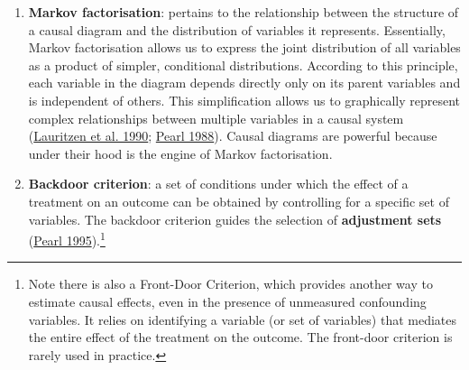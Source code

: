 \documentclass[
  singlecolumn]{article}
\begin{document}
\begin{enumerate}
\def\labelenumi{\arabic{enumi}.}
\setcounter{enumi}{9}
\item
  \textbf{Markov factorisation}: pertains to the relationship between
  the structure of a causal diagram and the distribution of variables it
  represents. Essentially, Markov factorisation allows us to express the
  joint distribution of all variables as a product of simpler,
  conditional distributions. According to this principle, each variable
  in the diagram depends directly only on its parent variables and is
  independent of others. This simplification allows us to graphically
  represent complex relationships between multiple variables in a causal
  system (\protect\hyperlink{ref-lauritzen1990}{Lauritzen et al. 1990};
  \protect\hyperlink{ref-pearl1988}{Pearl 1988}). Causal diagrams are
  powerful because under their hood is the engine of Markov
  factorisation.
\item
  \textbf{Backdoor criterion}: a set of conditions under which the
  effect of a treatment on an outcome can be obtained by controlling for
  a specific set of variables. The backdoor criterion guides the
  selection of \textbf{adjustment sets}
  (\protect\hyperlink{ref-pearl1995}{Pearl 1995}).\footnote{Note there
    is also a Front-Door Criterion, which provides another way to
    estimate causal effects, even in the presence of unmeasured
    confounding variables. It relies on identifying a variable (or set
    of variables) that mediates the entire effect of the treatment on
    the outcome. The front-door criterion is rarely used in practice.}
\end{enumerate}
\end{document}
